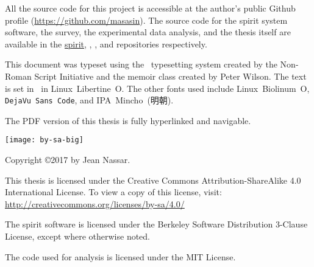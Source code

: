 \begin{titlingpage}
\maketitle
\thispagestyle{empty}

\clearpage
\null\vfill
\noindent \emph{\mytitle}

\noindent \emph{\mytitlejp}
\vspace{1em}

\noindent All the source code for this project is accessible at the author's public Github profile (\url{https://github.com/masasin}).
The source code for the \acrshort{spirit} system software, the survey, the experimental data analysis, and the thesis itself are available in the \href{https://github.com/masasin/spirit}{\textsf{spirit}}, \href{https://github.com/masasin/spirit_survey}{\textsf{}}, \href{https://github.com/masasin/spirit_analysis}{\textsf{}}, and \href{https://github.com/masasin/spirit_thesis}{\textsf{}} repositories respectively.
\vspace{1em}

\noindent This document was typeset using the \XeTeX\ typesetting system created by the Non-Roman Script Initiative and the \textsf{memoir} class created by Peter Wilson.
The text is set in \mytextsize\ in Linux~Libertine~O.
The other fonts used include \textsf{Linux~Biolinum~O}, \texttt{DejaVu~Sans~Code}, and IPA~Mincho~(明朝).
\vspace{1em}

\noindent The PDF version of this thesis is fully hyperlinked and navigable.
\vspace{1em}

\noindent \texttt{[image: by-sa-big]}

\noindent
Copyright \copyright 2017 by Jean Nassar.

\noindent This thesis is licensed under the Creative Commons Attribution-ShareAlike 4.0 International License.
To view a copy of this license, visit:\\
\url{http://creativecommons.org/licenses/by-sa/4.0/}

\noindent The \acrshort{spirit} software is licensed under the Berkeley Software Distribution 3-Clause License, except where otherwise noted.

\noindent The code used for analysis is licensed under the MIT License.
\end{titlingpage}


